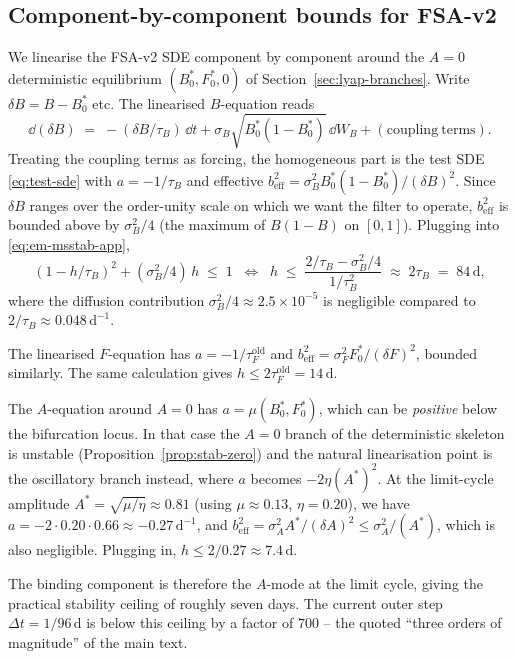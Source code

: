 \subsection{Component-by-component bounds for FSA-v2}\label{app:num-stab-fsa}

We linearise the FSA-v2 SDE component by component around the
$A=0$ deterministic equilibrium $(B^*_0,F^*_0,0)$ of
Section~\ref{sec:lyap-branches}. Write $\delta B = B - B^*_0$ etc. The
linearised $B$-equation reads
\begin{equation*}
  \dd(\delta B) \;=\; -(\delta B/\tau_B)\,\dd t + \sigma_B\sqrt{B^*_0(1-B^*_0)}\,\dd W_B
   + \mathrm{(coupling\ terms)}.
\end{equation*}
Treating the coupling terms as forcing, the homogeneous part is the
test SDE \eqref{eq:test-sde} with $a = -1/\tau_B$ and effective
$b^2_{\mathrm{eff}} = \sigma_B^2 B^*_0(1-B^*_0)/(\delta B)^2$. Since
$\delta B$ ranges over the order-unity scale on which we want the
filter to operate, $b_{\mathrm{eff}}^2$ is bounded above by
$\sigma_B^2/4$ (the maximum of $B(1-B)$ on $[0,1]$). Plugging into
\eqref{eq:em-msstab-app},
\[
  (1 - h/\tau_B)^2 + (\sigma_B^2/4)\,h \;\le\; 1
  \;\;\Longleftrightarrow\;\;
  h \;\le\; \frac{2/\tau_B - \sigma_B^2/4}{1/\tau_B^2}
  \;\approx\; 2\tau_B
  \;=\; 84\,\mathrm{d},
\]
where the diffusion contribution $\sigma_B^2/4 \approx 2.5 \times 10^{-5}$
is negligible compared to $2/\tau_B \approx 0.048\,\mathrm{d}^{-1}$.

The linearised $F$-equation has $a = -1/\tau_F^{\mathrm{old}}$
and $b_{\mathrm{eff}}^2 = \sigma_F^2 F^*_0/(\delta F)^2$, bounded
similarly. The same calculation gives
$h \le 2\tau_F^{\mathrm{old}} = 14\,\mathrm{d}$.

The $A$-equation around $A=0$ has $a = \mu(B^*_0,F^*_0)$,
which can be \emph{positive} below the bifurcation locus. In that
case the $A=0$ branch of the deterministic skeleton is unstable
(Proposition~\ref{prop:stab-zero}) and the natural linearisation
point is the oscillatory branch instead, where $a$ becomes
$-2\eta(A^*)^2$. At the limit-cycle amplitude
$A^* = \sqrt{\mu/\eta} \approx 0.81$ (using
$\mu \approx 0.13$, $\eta = 0.20$), we have
$a = -2 \cdot 0.20 \cdot 0.66 \approx -0.27\,\mathrm{d}^{-1}$, and
$b_{\mathrm{eff}}^2 = \sigma_A^2 A^*/(\delta A)^2 \le \sigma_A^2/(A^*)$,
which is also negligible. Plugging in,
$h \le 2/0.27 \approx 7.4\,\mathrm{d}$.

The binding component is therefore the $A$-mode at the limit cycle,
giving the practical stability ceiling of roughly seven days. The
current outer step $\Delta t = 1/96\,\mathrm{d}$ is below this ceiling
by a factor of $700$ -- the quoted ``three orders of magnitude'' of
the main text.

